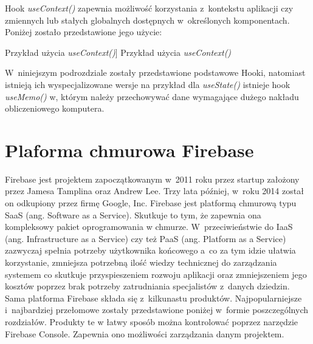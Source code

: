 \documentclass[../Kamil_Kowalewski_Main.tex]{subfiles}
\begin{document}
{{{            Hook \textit{useContext()} zapewnia możliwość korzystania z~kontekstu
            aplikacji czy zmiennych lub stałych globalnych dostępnych w~określonych
            komponentach. Poniżej zostało przedstawione jego użycie:
            \begin{code}[H]
                
                \caption
                [Przykład użycia \textit{useContext()}]
                {Przykład użycia \textit{useContext()}}
                \label{chapter3:technologie:react:hooks:usecontext}
            \end{code}

            W~niniejszym podrozdziale zostały przedstawione podstawowe Hooki, natomiast istnieją ich
            wyspecjalizowane wersje na przykład dla \textit{useState()} istnieje hook
            \textit{useMemo()} w, którym należy przechowywać dane wymagające dużego
            nakładu obliczeniowego komputera.
        }
    }

    \section{Plaforma chmurowa Firebase}
    \label{chapter3:technologie:firebase} {
        Firebase\cite{website:firebase} jest projektem zapoczątkowanym w~2011 roku przez startup
        założony przez Jamesa Tamplina oraz Andrew Lee. Trzy lata później, w~roku 2014
        został on odkupiony przez firmę Google, Inc. Firebase jest platformą chmurową typu SaaS
        (ang. Software as a Service). Skutkuje to tym, że zapewnia ona kompleksowy
        pakiet oprogramowania w chmurze. W~przeciwieństwie do IaaS
        (ang. Infrastructure as a Service) czy też PaaS (ang. Platform as a Service)
        zazwyczaj spełnia potrzeby użytkownika końcowego a~co za tym idzie ułatwia
        korzystanie, zmniejsza potrzebną ilość wiedzy technicznej do zarządzania
        systemem co skutkuje przyspieszeniem rozwoju aplikacji oraz zmniejszeniem jego
        kosztów poprzez brak potrzeby zatrudniania specjalistów z~danych dziedzin. Sama
        platforma Firebase składa się z~kilkunastu produktów. Najpopularniejsze
        i~najbardziej przełomowe zostały przedstawione poniżej w~formie poszczególnych
        rozdziałów. Produkty te w łatwy sposób można kontrolować poprzez narzędzie Firebase
        Console. Zapewnia ono możliwości zarządzania danym projektem.

}}
\end{document}
